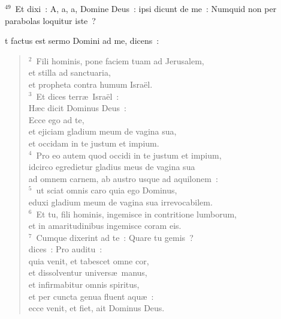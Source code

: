${}^{49}$~Et dixi~: A, a, a, Domine Deus~: ipsi dicunt de me~: Numquid non per parabolas loquitur iste~?

\bchapter
{}t factus est sermo Domini ad me, dicens~:
\begin{verse}\vspace{6pt}${}^{2}$~Fili hominis, pone faciem tuam ad Jerusalem,\\ et stilla ad sanctuaria,\\ et propheta contra humum Isra\"el.\\
${}^{3}$~Et dices terr\ae\ Isra\"el~:\\ H\ae c dicit Dominus Deus~:\\ Ecce ego ad te,\\ et ejiciam gladium meum de vagina sua,\\ et occidam in te justum et impium.\\
${}^{4}$~Pro eo autem quod occidi in te justum et impium,\\ idcirco egredietur gladius meus de vagina sua\\ ad omnem carnem, ab austro usque ad aquilonem~:\\
${}^{5}$~ut sciat omnis caro quia ego Dominus,\\ eduxi gladium meum de vagina sua irrevocabilem.\\
${}^{6}$~Et tu, fili hominis, ingemisce in contritione lumborum,\\ et in amaritudinibus ingemisce coram eis.\\
${}^{7}$~Cumque dixerint ad te~: Quare tu gemis~?\\ dices~: Pro auditu~:\\ quia venit, et tabescet omne cor,\\ et dissolventur univers\ae\ manus,\\ et infirmabitur omnis spiritus,\\ et per cuncta genua fluent aqu\ae~:\\ ecce venit, et fiet, ait Dominus Deus.\end{verse}


